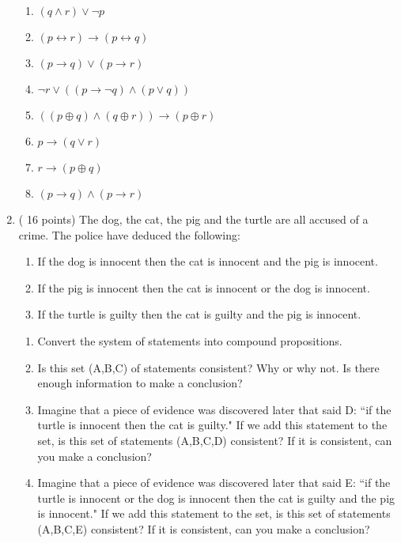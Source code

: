 \documentclass[10pt,letterpaper,unboxed,cm]{article}
\begin{document}
\begin{enumerate}
   
    
    \begin{enumerate}
        \item $(q\wedge r)\vee \lnot p$
        \item $(p\leftrightarrow r)\to (p\leftrightarrow q)$
        \item $(p \to q)\vee (p \to r)$
         \item $\lnot r \vee ((p \to \lnot q) \wedge (p\vee q))$
         \item $((p\oplus q)\wedge (q\oplus r))\to(p\oplus r)$
         \item $p \to (q\vee r)$
          \item $r\to (p\oplus q)$
          \item $(p \to q)\wedge (p \to r)$
          
          
    \end{enumerate}
    

    


\item ( 16 points)
The dog, the cat, the pig and the turtle are all accused of a crime. The police have deduced the following:

\begin{enumerate}[A:]
\item
If the dog is innocent then the cat is innocent and the pig is innocent.
\item
If the pig is innocent then the cat is innocent or the dog is innocent.
\item
If the turtle is guilty then the cat is guilty and the pig is innocent.
\end{enumerate}

\begin{enumerate}
\item
Convert the system of statements into compound propositions.
\item
Is this set (A,B,C) of statements consistent? Why or why not. Is there enough information to make a conclusion?
\item
Imagine that a piece of evidence was discovered later that said D: ``if the turtle is innocent then the cat is guilty." If we add this statement to the set, is this set of statements (A,B,C,D) consistent? If it is consistent, can you make a conclusion?
\item
Imagine that a piece of evidence was discovered later that said E: ``if the turtle is innocent or the dog is innocent then the cat is guilty and the pig is innocent." If we add this statement to the set, is this set of statements (A,B,C,E) consistent? If it is consistent, can you make a conclusion?
\end{enumerate}

\end{enumerate}
\end{document}
